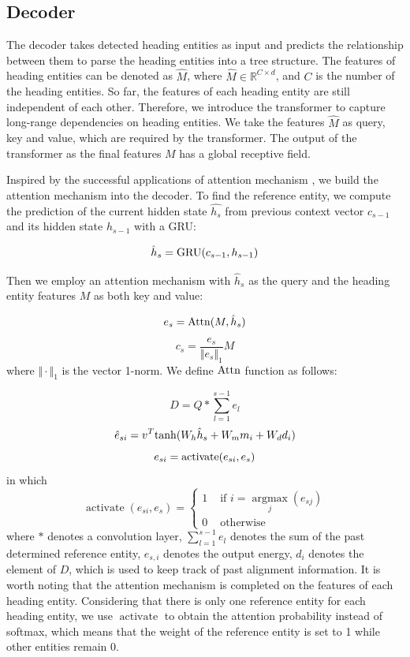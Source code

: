 \documentclass[a4paper,conference]{IEEEtran}
\begin{document}
\subsection{Decoder}
The decoder takes detected heading entities as input and predicts the relationship between them to parse the heading entities into a tree structure. The features of heading entities can be denoted as $\hat{M}$, where $\hat{M} \in \mathbb{R}^{C \times d}$, and $C$ is the number of the heading entities. So far, the features of each heading entity are still independent of each other. Therefore, we introduce the transformer\cite{transformer} to capture long-range dependencies on heading entities. We take the features $\hat{M}$ as query, key and value, which are required by the transformer. The output of the transformer as the final features ${M}$ has a global receptive field.

Inspired by the successful applications of attention mechanism\cite{wap} \cite{sem}, we build the attention mechanism into the decoder. To find the reference entity, we compute the prediction of the current hidden state $\hat{h_s}$ from previous context vector $c_{s-1}$ and its hidden state $h_{s-1}$ with a GRU:

$$\hat h_s={\rm{GRU}}(c_{s-1}, h_{s-1})$$

Then we employ an attention mechanism with $\hat{h}_s$ as the query and the heading entity features $M$ as both key and value:

$$e_s = {\rm Attn}(M, \hat{h}_s)$$
$$c_s = \frac{e_s}{\Vert e_s \Vert_1}M$$
where $\Vert \cdot \Vert_1$ is the vector 1-norm. We define ${\rm Attn}$ function as follows:

$${D}={Q} * \sum_{l=1}^{s-1} {e}_{l}$$
$$\hat{e}_{si} = v^T{\rm tanh}(W_{h}\hat{h}_s + W_mm_i + W_dd_i)$$
$$e_{si} = {\rm activate}(e_{si}, e_s)$$
in which
$$\operatorname{activate}(e_{si}, e_s)=\left\{\begin{array}{ll}
1 & \text { if } i=\mathop{\arg\max}\limits_{j} (e_{sj})\\
0 & \text { otherwise }
\end{array}\right.$$
where $*$ denotes a convolution layer, $\sum_{l=1}^{s-1} {e}_{l}$ denotes the sum of the past determined reference entity, $ \hat{e}_{s,i} $ denotes the output energy, $d_{i}$ denotes the element of $D$, which is used to keep track of past alignment information. It is worth noting that the attention mechanism is completed on the features of each heading entity. Considering that there is only one reference entity for each heading entity, we use $\operatorname{activate}$ to obtain the attention probability instead of softmax, which means that the weight of the reference entity is set to 1 while other entities remain 0.
\end{document}
